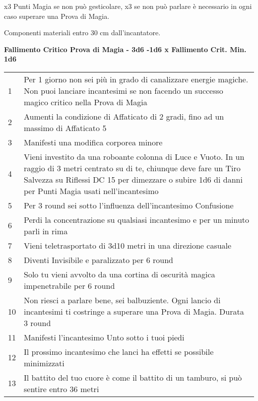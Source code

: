 \documentclass[landscape,10pt,a4paper]{article}
\begin{document}
\begin{multicols}{2}
\begin{dmbox}[title=Tentare Incantesimi con impedimenti - pagina \pageref{magieconimpedimenti}]
	
	x3 Punti Magia se non può gesticolare, x3 se non può parlare è necessario in ogni caso superare una Prova di Magia.
	
	Componenti materiali entro 30 cm dall'incantatore.
\end{dmbox}

\begin{dmbox}[title=Fallimento Critico Prova di Magia - pagina \pageref{magiefallimentocriticonellaprovadimagia}]

\textbf{Fallimento Critico Prova di Magia - 3d6 -1d6 x Fallimento Crit. Min. 1d6}
\begin{tabularx}{1\linewidth}{lX}
1 & Per 1 giorno non sei più in grado di canalizzare energie magiche. Non puoi lanciare incantesimi se non facendo un successo magico critico nella Prova di Magia\\
2 & Aumenti la condizione di Affaticato di 2 gradi, fino ad un massimo di Affaticato 5\\
3 & Manifesti una modifica corporea minore\\
4 & Vieni investito da una roboante colonna di Luce e Vuoto. In un raggio di 3 metri centrato su di te, chiunque deve fare un Tiro Salvezza su Riflessi DC 15 per dimezzare o subire 1d6 di danni per Punti Magia usati nell'incantesimo\\
5 & Per 3 round sei sotto l'influenza dell'incantesimo Confusione\\
6 & Perdi la concentrazione su qualsiasi incantesimo e per un minuto parli in rima\\
7 & Vieni teletrasportato di 3d10 metri in una direzione casuale\\
8 & Diventi Invisibile e paralizzato per 6 round\\
9 & Solo tu vieni avvolto da una cortina di oscurità magica impenetrabile per 6 round\\
10 & Non riesci a parlare bene, sei balbuziente. Ogni lancio di incantesimi ti costringe a superare una Prova di Magia. Durata 3 round\\
11 & Manifesti l'incantesimo Unto sotto i tuoi piedi\\
12 & Il prossimo incantesimo che lanci ha effetti se possibile minimizzati\\
13 & Il battito del tuo cuore è come il battito di un tamburo, si può sentire entro 36 metri\\

\end{tabularx}
\end{dmbox}
\end{multicols}
\end{document}
